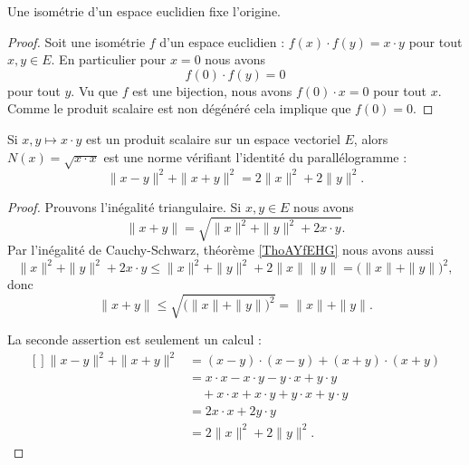 \begin{lemma}       \label{LEMooYXJZooWKRFRu}
    Une isométrie d'un espace euclidien fixe l'origine.
\end{lemma}

\begin{proof}
    Soit une isométrie \( f\) d'un espace euclidien : \( f(x)\cdot f(y)=x\cdot y\) pour tout \( x,y\in E\). En particulier pour \( x=0\) nous avons
    \begin{equation}
        f(0)\cdot f(y)=0
    \end{equation}
    pour tout \( y\). Vu que \( f\) est une bijection, nous avons \( f(0)\cdot x=0\) pour tout \( x\). Comme le produit scalaire est non dégénéré cela implique que \( f(0)=0\).
\end{proof}
 

\begin{proposition} \label{PropEQRooQXazLz}
    Si \( x,y\mapsto x\cdot y\) est un produit scalaire sur un espace vectoriel \( E\), alors \( N(x)=\sqrt{x\cdot x}\) est une norme vérifiant l'identité du parallélogramme :
    \begin{equation}        \label{EqYCLtWfJ}
        \| x-y \|^2+\| x+y \|^2=2\| x \|^2+2\| y \|^2.
    \end{equation}
\end{proposition}

\begin{proof}

    Prouvons l'inégalité triangulaire. Si \( x,y\in E\) nous avons
    \begin{equation}
        \| x+y \|=\sqrt{\| x \|^2+\| y \|^2+2x\cdot y}.
    \end{equation}
    Par l'inégalité de Cauchy-Schwarz, théorème \ref{ThoAYfEHG} nous avons aussi
    \begin{equation}
        \| x \|^2+\| y \|^2+2x\cdot y\leq \| x \|^2+\| y \|^2+2\| x \|\| y \|=\big( \| x \|+\| y \| \big)^2,
    \end{equation}
    donc
    \begin{equation}
        \| x+y \|\leq \sqrt{\big( \| x \|+\| y \| \big)^2}=\| x \|+\| y \|.
    \end{equation}

    La seconde assertion est seulement un calcul :
			\begin{equation}
				\begin{aligned}[]
					\| x-y \|^2+\| x+y \|^2&=(x-y)\cdot (x-y)+(x+y)\cdot(x+y)\\
					&=x\cdot x-x\cdot y-y\cdot x+y\cdot y\\
					&\quad +x\cdot x+x\cdot y+y\cdot x+y\cdot y\\
					&=2x\cdot x+2y\cdot y\\
					&=2\| x \|^2+2\| y \|^2.
				\end{aligned}
			\end{equation}
\end{proof}


